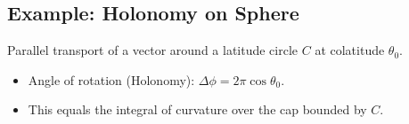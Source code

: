 \documentclass[a4paper,12pt]{article}
\begin{document}
\subsection{Example: Holonomy on Sphere}
Parallel transport of a vector around a latitude circle $C$ at colatitude $\theta_0$.
\begin{itemize}
    \item Angle of rotation (Holonomy): $\Delta \phi = 2\pi \cos \theta_0$.
    \item This equals the integral of curvature over the cap bounded by $C$.
\end{itemize}
\end{document}
